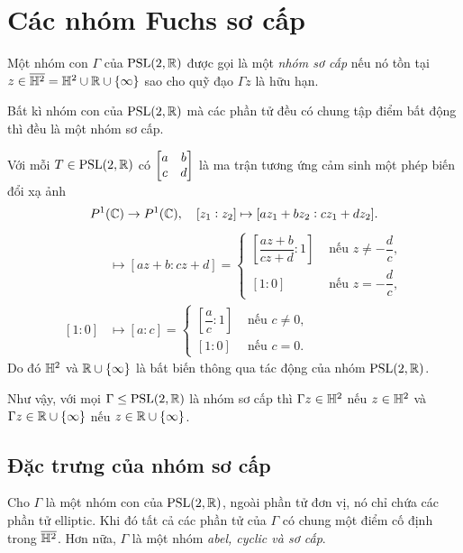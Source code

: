 \section{Các nhóm Fuchs sơ cấp}
\begin{defn}
    Một nhóm con $\Gamma$ của $\operatorname{PSL}(2,\mathbb{R})$ được gọi là một \textit{nhóm sơ cấp} nếu nó tồn tại $z \in \overline{\mathbb{H}^2} = \mathbb{H}^2 \cup \mathbb{R} \cup \{\infty\}$ sao cho quỹ đạo $\Gamma z$ là hữu hạn.
\end{defn}
\begin{exam*}
    Bất kì nhóm con của $\operatorname{PSL}(2,\mathbb{R})$ mà các phần tử đều có chung tập điểm bất động thì đều là một nhóm sơ cấp.
\end{exam*}
\begin{comment*}
Với mỗi $T \in \PSL(2,\R)$ có $\matt$ là ma trận tương ứng cảm sinh một phép biến đổi xạ ảnh
\[P^1(\C) \to P^1(\C), \quad [z_1:z_2] \mapsto [az_1+bz_2:cz_1+dz_2].\]
      \begin{align*}
      [z:1] &\mapsto [az+b:cz+d]=
      \begin{cases}
        \left[\dfrac{az+b}{cz+d}:1\right]   & \text{ nếu } z \neq -\dfrac{d}{c},\\
        [1:0]   & \text{ nếu } z= -\dfrac{d}{c},
      \end{cases}\\
     [1:0] &\mapsto \left[a:c\right] = \begin{cases}
          \left[\dfrac{a}{c}:1\right]   & \text{ nếu } c \neq 0,\\
         [1:0]   & \text{ nếu }  c = 0.
      \end{cases}
      \end{align*}
Do đó $\hh$ và $\R \cup \{\infty\}$ là bất biến thông qua tác động của nhóm $\PSL(2,\R)$. 

Như vậy, với mọi $\Gamma \leq \PSL(2,\R)$ là nhóm sơ cấp thì $\Gamma z \in \hh$ nếu $z\in \hh$ và $\Gamma z \in \R\cup \{\infty\}$ nếu $z\in \R\cup \{\infty\}$. 
\end{comment*}


\subsection{Đặc trưng của nhóm sơ cấp}
\begin{thm}\label{thm 3.4.3}
    Cho $\Gamma$ là một nhóm con của $\operatorname{PSL}(2,\mathbb{R})$, ngoài phần tử đơn vị, nó chỉ chứa các phần tử elliptic. Khi đó tất cả các phần tử của $\Gamma$ có chung một điểm cố định trong $\overline{\mathbb{H}^2}$. Hơn nữa, $\Gamma$ là một nhóm \textit{abel, cyclic và sơ cấp}.
\end{thm}

